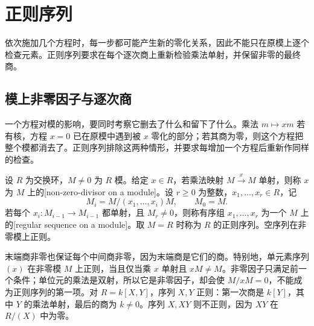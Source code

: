 
\section{正则序列}
\label{b3:sec:1501}

依次施加几个方程时，每一步都可能产生新的零化关系，因此不能只在原模上逐个检查元素。正则序列要求在每个逐次商上重新检验乘法单射，并保留非零的最终商。


%
%

\subsection{模上非零因子与逐次商}
\label{b3:subsec:1501:01}

一个方程对模的影响，要同时考察它删去了什么和留下了什么。乘法 \(m\mapsto xm\) 若有核，方程 \(x=0\) 已在原模中遇到被 \(x\) 零化的部分；若其商为零，则这个方程把整个模都消去了。正则序列排除这两种情形，并要求每增加一个方程后重新作同样的检查。

\begin{definition}\label{b3:def:regular-sequence}
	设 \(R\) 为交换环，\(M\ne0\) 为 \(R\) 模。给定 \(x\in R\)，若乘法映射 \(M\xrightarrow{x}M\) 单射，则称 \(x\) 为 \(M\) 上的[non-zero-divisor on a module]。设 \(r\ge0\) 为整数，\(x_1,\ldots,x_r\in R\)，记
	\[
		M_i=M/(x_1,\ldots,x_i)M,\qquad M_0=M.
	\]
	若每个 \(x_i:M_{i-1}\rightarrow M_{i-1}\) 都单射，且 \(M_r\ne0\)，则称有序组 \(x_1,\ldots,x_r\) 为一个 \(M\) 上的[regular sequence on a module]。取 \(M=R\) 时称为 \(R\) 的正则序列。空序列在非零模上正则。
\end{definition}

末端商非零也保证每个中间商非零，因为末端商是它们的商。特别地，单元素序列 \((x)\) 在非零模 \(M\) 上正则，当且仅当乘 \(x\) 单射且 \(xM\ne M\)。非零因子只满足前一个条件；单位元的乘法是双射，所以它是非零因子，却会使 \(M/xM=0\)，不能成为正则序列的第一项。对 \(R=k[X,Y]\)，序列 \(X,Y\) 正则：第一次商是 \(k[Y]\)，其中 \(Y\) 的乘法单射，最后的商为 \(k\ne0\)。序列 \(X,XY\) 则不正则，因为 \(XY\) 在 \(R/(X)\) 中为零。

